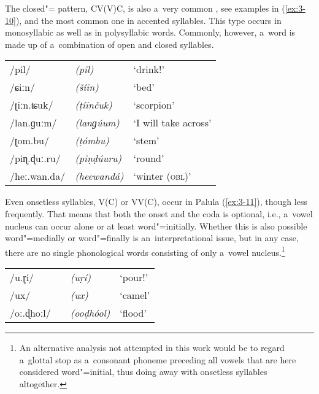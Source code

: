 

The closed"= pattern, CV(V)C, is also a~very common , see examples in (\ref{ex:3-10}), and the most common one in accented syllables. This type occurs in monosyllabic as well as in polysyllabic words. Commonly, however, a~word is made up of a~combination of open and closed syllables. 


\begin{exe}
\extab
\label{ex:3-10} 
\begin{tabular}{ l l l }
/pil/ &
\textit{(pil)} &
`drink!' \\
/ɕiːn/ &
\textit{(\v{s}íin)} &
`bed'\\
/ʈiːn.ʨuk/ &
\textit{(ṭíinčuk)} &
`scorpion'\\
/lan.ɡuːm/ &
\textit{(lanɡúum)} &
`I will take across'\\
/ʈom.bu/ &
\textit{(ṭómbu)} &
`stem'\\
/piɳ.ɖuː.ru/ &
\textit{(piṇḍúuru)} &
`round'\\
/heː.wan.da/ &
\textit{(heewandá)} &
`winter (\textsc{obl)}'\\
\end{tabular}
\end{exe}


Even onsetless syllables, V(C) or VV(C), occur in Palula (\ref{ex:3-11}), though less frequently. That means that both the onset and the coda is optional, i.e., a~vowel nucleus can occur alone or at least word"=initially. Whether this is also possible word"=medially or word"=finally is an~interpretational issue, but in any case, there are no single phonological words consisting of only a~vowel nucleus.\footnote{An alternative analysis not attempted in this work would be to regard a~glottal stop as a~consonant phoneme preceding all vowels that are here considered word"=initial, thus doing away with onsetless syllables altogether.}


\begin{exe}
\extab
\label{ex:3-11}
\begin{tabular}{ l l l }
/u.ɽi/ &
\textit{(uṛí)} &
`pour!' \\
/ux/ &
\textit{(ux)} &
`camel'\\
/oː.ɖhoːl/\ \ &
\textit{(ooḍhóol)} &
`flood'\\
\end{tabular}
\end{exe}


